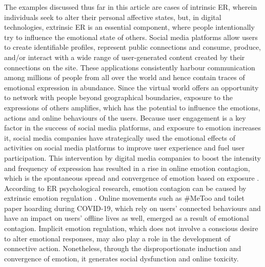 \documentclass[lettersize,journal]{IEEEtran}
\begin{document}
The examples discussed thus far in this article are cases of intrinsic ER, wherein individuals seek to alter their personal affective states, but, in digital technologies, extrinsic ER is an essential component, where people intentionally try to influence the emotional state of others. Social media platforms allow users to create identifiable profiles, represent public connections and consume, produce, and/or interact with a wide range of user-generated content created by their connections on the site. These applications consistently harbour communication among millions of people from all over the world and hence contain traces of emotional expression in abundance. Since the virtual world offers an opportunity to network with people beyond geographical boundaries, exposure to the expressions of others amplifies, which has the potential to influence the emotions, actions and online behaviours of the users. Because user engagement is a key factor in the success of social media platforms, and exposure to emotion increases it, social media companies have strategically used the emotional effects of activities on social media platforms to improve user experience and fuel user participation. This intervention by digital media companies to boost the intensity and frequency of expression has resulted in a rise in online emotion contagion, which is the spontaneous spread and convergence of emotion based on exposure \cite{goldenberg2020digital}. According to ER psychological research, emotion contagion can be caused by extrinsic emotion regulation \cite{elfenbein2014many}. Online movements such as \#MeToo and toilet paper hoarding during COVID-19, which rely on users' connected behaviours and have an impact on users' offline lives as well, emerged as a result of emotional contagion. Implicit emotion regulation, which does not involve a conscious desire to alter emotional responses, may also play a role in the development of connective action. Nonetheless, through the disproportionate induction and convergence of emotion, it generates social dysfunction and online toxicity.
\end{document}
